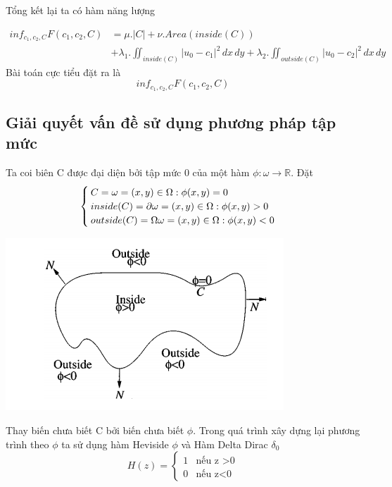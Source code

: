 \documentclass[12pt,oneside,a4]{report}
\begin{document}
Tổng kết lại ta có hàm năng lượng

\begin{equation}
\begin{split}
inf_{c_1,c_2,C} F(c_1, c_2, C)&=\mu .|C|+\nu .Area(inside(C)) \\ 
&+\lambda_1 .\iint_{inside(C)} |u_0-c_1|^2 \,dx\,dy+\lambda_2 .\iint_{outside(C)} |u_0-c_2|^2 \,dx\,dy
\end{split}
\end{equation}
Bài toán cực tiểu đặt ra là
\begin{equation}
inf_{c_1,c_2,C} F(c_1, c_2, C)
\end{equation}
 
\subsection{Giải quyết vấn đề sử dụng phương pháp tập mức}
Ta coi biên C được đại diện bởi tập mức 0 của một hàm $\phi: \omega \rightarrow \mathbb{R}$. Đặt 
\begin{equation}
\begin{cases}
 C= \omega ={(x,y)\in \Omega: \phi(x,y)=0}\\
 inside(C)=\partial \omega ={(x,y)\in \Omega: \phi(x,y)>0}\\
 outside(C)=\Omega \/ \omega ={(x,y)\in \Omega: \phi(x,y)<0}
   \end{cases}
\end{equation}
 \begin{center}
\includegraphics[scale=0.6]{figure/insideoutside.png}
\end{center}
Thay biến chưa biết C bởi biến chưa biết $\phi$.  Trong quá trình xây dựng lại phương trình theo $\phi$ ta sử dụng hàm Heviside $\phi$ và Hàm Delta Dirac $\delta_0$
 \begin{equation}
 H(z)=
\begin{cases}
 1 & \text{nếu z >0}\\
0 & \text{nếu z<0}
   \end{cases}
\end{equation}
\end{document}
